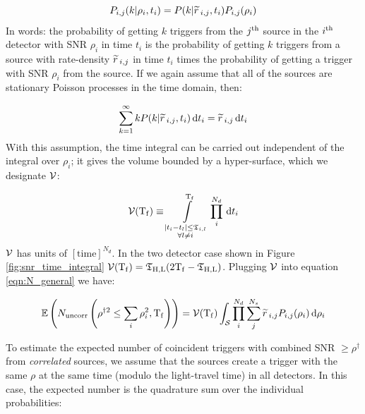 \begin{equation}
\label{eqn:twoDpdf}
P_{i,j}(k|\rho_i,t_i) = P(k|\rsrc_{i,j},t_i)P_{i,j}(\rho_i)
\end{equation}
In words: the probability of getting $k$ triggers from the $j^{\mathrm{th}}$ source in the $i^{\mathrm{th}}$ detector with \ac{SNR} $\rho_i$ in time $t_i$ is the probability of getting $k$ triggers from a source with rate-density $\widetilde{r}\,_{i,j}$ in time $t_i$ times the probability of getting a trigger with \ac{SNR} $\rho_i$ from the source. If we again assume that all of the sources are stationary Poisson processes in the time domain, then:

\begin{equation}
\sum_{k=1}^{\infty} k P(k|\widetilde{r}\,_{i,j},t_i) \,\mathrm{d} t_i = \widetilde{r}\,_{i,j} \,\mathrm{d} t_i
\end{equation}
With this assumption, the time integral can be carried out independent of the integral over $\rho_i$; it gives the volume bounded by a hyper-surface, which we designate $\mathcal{V}$:

\begin{equation}
\label{eqn:vTdef}
\vT(\Tf) \equiv \int\limits_{\substack{ |t_i - t_l| \leq \coincT_{i,l} \\ \forall l \neq i}}^{\Tf} \prod_i^{N_d} \d t_i
\end{equation}
$\mathcal{V}$ has units of $[\mathrm{time}]^{N_d}$. In the two detector case shown in Figure \ref{fig:snr_time_integral} $\mathcal{V}(\mathrm{T_f}) = \mathfrak{T}_{\mathrm{H},\mathrm{L}}(2\mathrm{T_f} - \mathfrak{T}_{\mathrm{H},\mathrm{L}})$. Plugging $\mathcal{V}$ into equation \ref{eqn:N_general} we have:

\begin{equation}
\label{eqn:N_rate_general}
\Exptd\left(N_{\mathrm{uncorr}}\left(\rho^{\dagger2} \leq \sum_i\rho_i^2, \Tf \right)\right) = \vT(\Tf) \int_{\mathcal{S}} \prod_i^{N_d} \sum_j^{N_s} \rsrc_{i,j} P_{i,j}(\rho_i) \d\rho_i
\end{equation}

To estimate the expected number of coincident triggers with combined \ac{SNR} $\geq \rho^\dagger$ from \emph{correlated} sources, we assume that the sources create a trigger with the same $\rho$ at the same time (modulo the light-travel time) in all detectors. In this case, the expected number is the quadrature sum over the individual probabilities:

